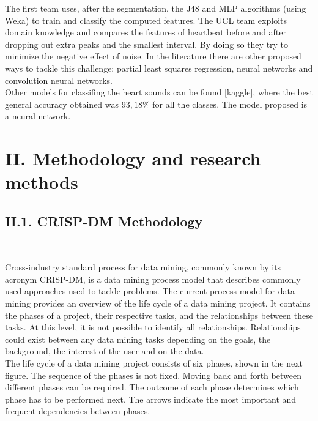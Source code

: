 \documentclass[11pt, a4papper]{report}
\theoremstyle{plain}
\theoremstyle{definition}
\theoremstyle{definition}
\theoremstyle{proposition}
\begin{document}
The first team uses, after the segmentation, the J48 and MLP algorithms (using Weka) to train and classify the computed features. The UCL team exploits domain knowledge and compares the features of heartbeat before and after dropping out extra peaks and the smallest interval. By doing so they try to minimize the negative effect of noise. In the literature there are other proposed ways to tackle this challenge: partial least squares regression, neural networks and convolution neural networks.
\\

Other models for classifing the heart sounds can be found [kaggle], where the best general accuracy obtained was $93,18 \%$ for all the classes. The model proposed is a neural network.


\newpage



\chapter*{II. Methodology and research methods}

\section*{II.1. CRISP-DM Methodology}

\

Cross-industry standard process for data mining, commonly known by its acronym CRISP-DM, is a data mining process model that describes commonly used approaches used to tackle problems. The current process model for data mining provides an overview of the life cycle of a data mining project. It contains the phases of a project, their respective tasks, and the relationships between these tasks. At this level, it is not possible to identify all relationships. Relationships could exist between any data mining tasks depending on the goals, the background, the interest of the user and on the data. 
\\

The life cycle of a data mining project consists of six phases, shown in the next figure. The sequence of the phases is not fixed. Moving back and forth between different phases can be required. The outcome of each phase determines which phase has to be performed next. The arrows indicate the most important and frequent dependencies between phases.
\\
\end{document}
